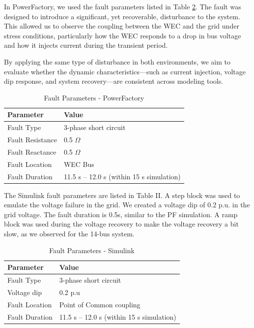 \documentclass[conference]{IEEEtran}
\begin{document}
        In PowerFactory, we used the fault parameters listed in Table \ref{table:pf_fault}. The fault was designed to introduce a significant, yet recoverable, disturbance to the system. This allowed us to observe the coupling between the WEC and the grid under stress conditions, particularly how the WEC responds to a drop in bus voltage and how it injects current during the transient period.
        
        By applying the same type of disturbance in both environments, we aim to evaluate whether the dynamic characteristics—such as current injection, voltage dip response, and system recovery—are consistent across modeling tools.
        
        \begin{table}
            \centering
            \caption{Fault Parameters - PowerFactory}
            \begin{tabular}{|l|l|}
            \hline
            \textbf{Parameter} & \textbf{Value} \\ \hline
            Fault Type & 3-phase short circuit \\ \hline
            Fault Resistance & 0.5 $\Omega$ \\ \hline
            Fault Reactance & 0.5 $\Omega$ \\ \hline
            Fault Location & WEC Bus \\ \hline
            Fault Duration & 11.5 s – 12.0 s (within 15 s simulation) \\ \hline
            \end{tabular}
            \label{table:pf_fault}
        \end{table}

        
        
        The Simulink fault parameters are listed in Table II. A step block was used to emulate the voltage failure in the grid. We created a voltage dip of 0.2 p.u. in the grid voltage. The fault duration is 0.5s, similar to the PF simulation. A ramp block was used during the voltage recovery to make the voltage recovery a bit slow, as we observed for the 14-bus system.    \begin{table}
            \centering
            \caption{Fault Parameters - Simulink}
            \begin{tabular}{|l|l|}
            \hline
            \textbf{Parameter} & \textbf{Value} \\ \hline
            Fault Type & 3-phase short circuit \\ \hline
            Voltage dip & 0.2 p.u  \\ \hline
            Fault Location & Point of Common coupling \\ \hline
            Fault Duration & 11.5 s – 12.0 s (within 15 s simulation) \\ \hline
            \end{tabular}
            \label{table:pf_fault}
        \end{table}
\end{document}
